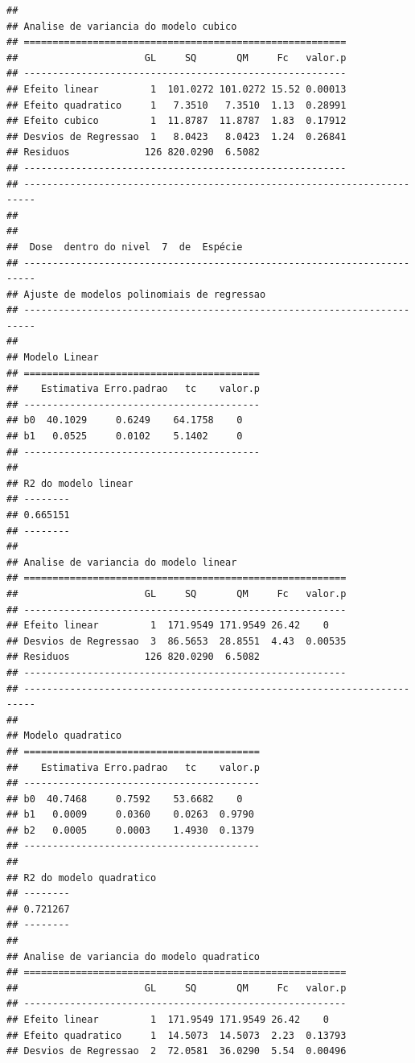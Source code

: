 \documentclass[
]{article}
\begin{document}
\begin{verbatim}
## 
## Analise de variancia do modelo cubico
## ========================================================
##                      GL     SQ       QM     Fc   valor.p
## --------------------------------------------------------
## Efeito linear         1  101.0272 101.0272 15.52 0.00013
## Efeito quadratico     1   7.3510   7.3510  1.13  0.28991
## Efeito cubico         1  11.8787  11.8787  1.83  0.17912
## Desvios de Regressao  1   8.0423   8.0423  1.24  0.26841
## Residuos             126 820.0290  6.5082               
## --------------------------------------------------------
## ------------------------------------------------------------------------
## 
## 
##  Dose  dentro do nivel  7  de  Espécie 
## ------------------------------------------------------------------------
## Ajuste de modelos polinomiais de regressao
## ------------------------------------------------------------------------
## 
## Modelo Linear
## =========================================
##    Estimativa Erro.padrao   tc    valor.p
## -----------------------------------------
## b0  40.1029     0.6249    64.1758    0   
## b1   0.0525     0.0102    5.1402     0   
## -----------------------------------------
## 
## R2 do modelo linear
## --------
## 0.665151
## --------
## 
## Analise de variancia do modelo linear
## ========================================================
##                      GL     SQ       QM     Fc   valor.p
## --------------------------------------------------------
## Efeito linear         1  171.9549 171.9549 26.42    0   
## Desvios de Regressao  3  86.5653  28.8551  4.43  0.00535
## Residuos             126 820.0290  6.5082               
## --------------------------------------------------------
## ------------------------------------------------------------------------
## 
## Modelo quadratico
## =========================================
##    Estimativa Erro.padrao   tc    valor.p
## -----------------------------------------
## b0  40.7468     0.7592    53.6682    0   
## b1   0.0009     0.0360    0.0263  0.9790 
## b2   0.0005     0.0003    1.4930  0.1379 
## -----------------------------------------
## 
## R2 do modelo quadratico
## --------
## 0.721267
## --------
## 
## Analise de variancia do modelo quadratico
## ========================================================
##                      GL     SQ       QM     Fc   valor.p
## --------------------------------------------------------
## Efeito linear         1  171.9549 171.9549 26.42    0   
## Efeito quadratico     1  14.5073  14.5073  2.23  0.13793
## Desvios de Regressao  2  72.0581  36.0290  5.54  0.00496

\end{verbatim}
\end{document}
